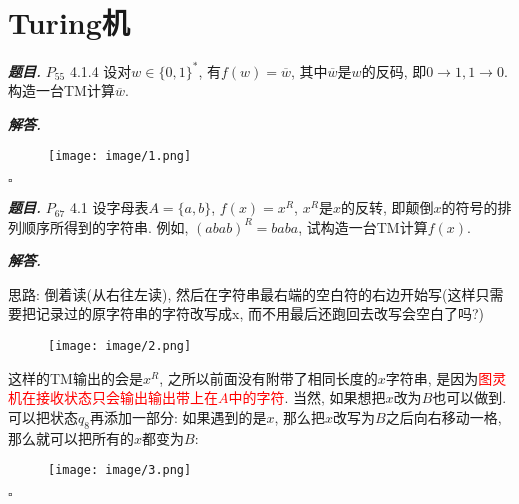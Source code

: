 \documentclass[10pt, a4paper, oneside]{ctexart}
\newenvironment{problem}{\begin{framed}\par\noindent\textbf{\textit{题目. }}}{\end{framed}\par}
\newenvironment{solution}{%
  \par\noindent\textbf{\textit{解答. }}\ignorespaces
}{%
  \hfill\ensuremath{\square}\par
}
\begin{document}
\newpage

\section{Turing机}

\begin{problem}
$P_{55}$ 4.1.4 设对$w\in \{0,1\}^*$, 有$f(w)=\overline{w}$, 其中$\overline{w}$是$w$的反码, 即$0\to 1, 1\to 0$. 构造一台TM计算$\overline{w}$.
\end{problem}

\begin{solution}

\begin{figure}[h]
    \centering
    \texttt{[image: image/1.png]}
\end{figure}
\end{solution}

\begin{problem}
$P_{67}$ 4.1 设字母表$A=\{a,b\}$, $f(x)=x^R$, $x^R$是$x$的反转, 即颠倒$x$的符号的排列顺序所得到的字符串. 例如, $(abab)^R=baba$, 试构造一台TM计算$f(x)$.
\end{problem}
\begin{solution}
思路: 倒着读(从右往左读), 然后在字符串最右端的空白符的右边开始写(这样只需要把记录过的原字符串的字符改写成x, 而不用最后还跑回去改写会空白了吗?)
\begin{figure}[h]
    \centering
    \texttt{[image: image/2.png]}
\end{figure}
这样的TM输出的会是$x^R$, 之所以前面没有附带了相同长度的$x$字符串, 是因为\textcolor{red}{图灵机在接收状态只会输出输出带上在$A$中的字符}.
\newpage
当然, 如果想把$x$改为$B$也可以做到. 可以把状态$q_8$再添加一部分: 如果遇到的是$x$, 那么把$x$改写为$B$之后向右移动一格, 那么就可以把所有的$x$都变为$B$:
\begin{figure}[h]
    \centering
    \texttt{[image: image/3.png]}
\end{figure}
\end{solution}
\end{document}
